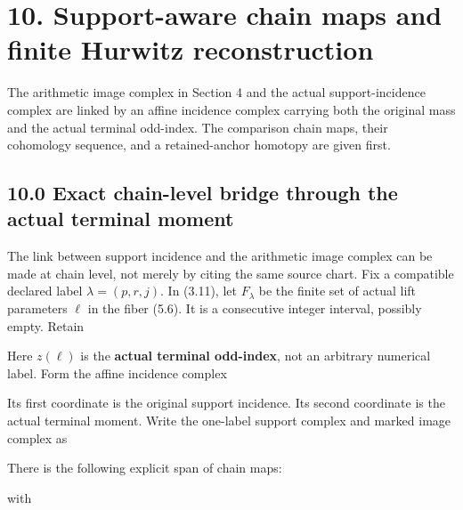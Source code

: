 \section{10. Support-aware chain maps and finite Hurwitz reconstruction}

The arithmetic image complex in Section 4 and the actual
support-incidence complex are linked by an affine incidence complex
carrying both the original mass and the actual terminal odd-index. The
comparison chain maps, their cohomology sequence, and a retained-anchor
homotopy are given first.

\subsection{10.0 Exact chain-level bridge through the actual terminal
moment}

The link between support incidence and the arithmetic image complex can
be made at chain level, not merely by citing the same source chart. Fix
a compatible declared label \(\lambda=(p,r,j)\). In (3.11), let
\(F_\lambda\) be the finite set of actual lift parameters \(\ell\) in
the fiber (5.6). It is a consecutive integer interval, possibly empty.
Retain


Here \(z(\ell)\) is the \textbf{actual terminal odd-index}, not an
arbitrary numerical label. Form the affine incidence complex


Its first coordinate is the original support incidence. Its second
coordinate is the actual terminal moment. Write the one-label support
complex and marked image complex as


There is the following explicit span of chain maps:


with


